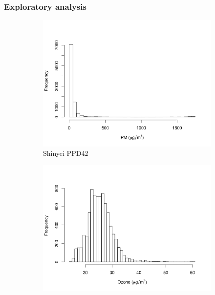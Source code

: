 \documentclass[11pt]{report}
\begin{document}
\subsubsection{Exploratory analysis}

\begin{figure}[!tbp]
    \centering
    \begin{minipage}{1\linewidth}
            \begin{subfigure}[t]{.5\linewidth}
                \includegraphics[width=\textwidth]{images/pm_histogram}
                \caption{Shinyei PPD42}
                \label{fig:pm_histogram}
            \end{subfigure}
            \begin{subfigure}[t]{.5\linewidth}
            	\includegraphics[width=\textwidth]{images/ozone_histogram}

\end{subfigure}
\end{minipage}
\end{figure}
\end{document}
